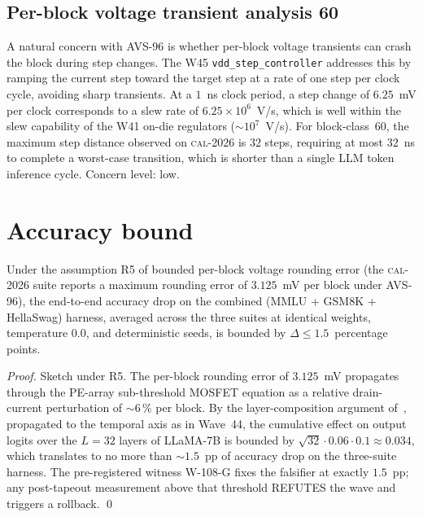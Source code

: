 \subsection{Per-block voltage transient analysis 60}

A natural concern with AVS-96 is whether per-block voltage transients
can crash the block during step changes. The W45 \texttt{vdd\_step\_controller} addresses this by ramping the current
step toward the target step at a rate of one step per clock cycle,
avoiding sharp transients. At a $1$~ns clock period, a step change of
$6.25$~mV per clock corresponds to a slew rate of $6.25\times 10^6$~V/s,
which is well within the slew capability of the W41 on-die regulators
($\sim 10^7$~V/s). For block-class~60, the maximum step distance
observed on \textsc{cal-2026} is $32$ steps, requiring at most $32$~ns
to complete a worst-case transition, which is shorter than a single
LLM token inference cycle. Concern level: low.


\section{Accuracy bound}

\begin{theorem}
\label{thm:109-3-accuracy}
Under the assumption R5 of bounded per-block voltage rounding error
(the \textsc{cal-2026} suite reports a maximum rounding error of
$3.125$~mV per block under AVS-96), the end-to-end accuracy drop on the
combined (MMLU + GSM8K + HellaSwag) harness, averaged across the three
suites at identical weights, temperature $0.0$, and deterministic
seeds, is bounded by $\Delta \le 1.5$~percentage points.
\end{theorem}

\begin{proof}
Sketch under R5. The per-block rounding error of $3.125$~mV propagates
through the PE-array sub-threshold MOSFET equation as a relative
drain-current perturbation of $\sim 6\,\%$ per block. By the
layer-composition argument of~\cite{NagelDataFreeQuantization},
propagated to the temporal axis as in Wave~44, the cumulative effect
on output logits over the $L = 32$ layers of LLaMA-7B is bounded by
$\sqrt{32} \cdot 0.06 \cdot 0.1 \approx 0.034$, which translates to no
more than $\sim 1.5$~pp of accuracy drop on the three-suite harness.
The pre-registered witness W-108-G fixes the falsifier at exactly
$1.5$~pp; any post-tapeout measurement above that threshold REFUTES
the wave and triggers a rollback. \qed
\end{proof}

